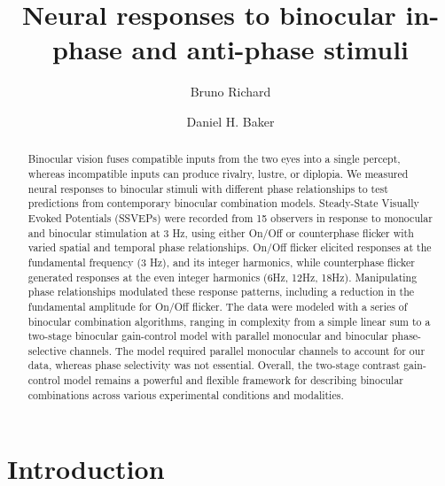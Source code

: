 \documentclass[
  12pt,
]{article}
\title{Neural responses to binocular in-phase and anti-phase stimuli}
\author[1]{Bruno Richard}
\author[2]{Daniel H. Baker}
\affil[1]{Department of Math and Computer Sciences, Rutgers
University, Newark, New Jersey, USA}
\affil[2]{Department of Psychology, University of York, York, UK}
\date{}
\begin{document}
\maketitle
\begin{abstract}
Binocular vision fuses compatible inputs from the two eyes into a single
percept, whereas incompatible inputs can produce rivalry, lustre, or
diplopia. We measured neural responses to binocular stimuli with
different phase relationships to test predictions from contemporary
binocular combination models. Steady-State Visually Evoked Potentials
(SSVEPs) were recorded from 15 observers in response to monocular and
binocular stimulation at 3 Hz, using either On/Off or counterphase
flicker with varied spatial and temporal phase relationships. On/Off
flicker elicited responses at the fundamental frequency (3 Hz), and its
integer harmonics, while counterphase flicker generated responses at the
even integer harmonics (6Hz, 12Hz, 18Hz). Manipulating phase
relationships modulated these response patterns, including a reduction
in the fundamental amplitude for On/Off flicker. The data were modeled
with a series of binocular combination algorithms, ranging in complexity
from a simple linear sum to a two-stage binocular gain-control model
with parallel monocular and binocular phase-selective channels. The
model required parallel monocular channels to account for our data,
whereas phase selectivity was not essential. Overall, the two-stage
contrast gain-control model remains a powerful and flexible framework
for describing binocular combinations across various experimental
conditions and modalities.
\end{abstract}


\section{Introduction}\label{introduction}
\end{document}

